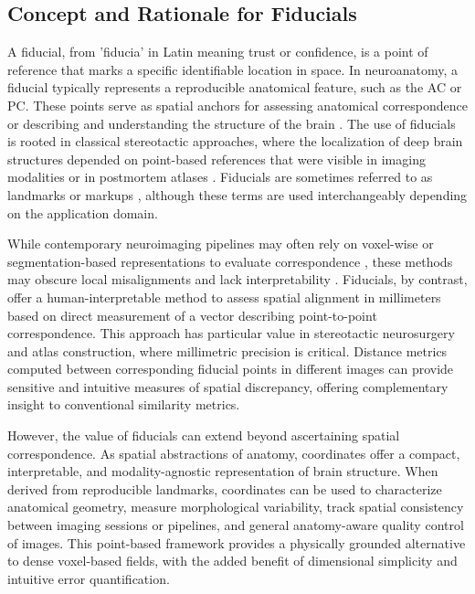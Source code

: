 \subsection{Concept and Rationale for Fiducials}
A fiducial, from 'fiducia' in Latin meaning trust or confidence, is a point of reference that marks a specific identifiable location in space. In neuroanatomy, a fiducial typically represents a reproducible anatomical feature, such as the AC or PC. These points serve as spatial anchors for assessing anatomical correspondence \cite{Schonecker2009-xj,Lau2019-eh} or describing and understanding the structure of the brain \cite{Abbass2022-lf}. The use of fiducials is rooted in classical stereotactic approaches, where the localization of deep brain structures depended on point-based references that were visible in imaging modalities or in postmortem atlases \cite{Schaltenbrand1977-ge, Talalrach1957-bs}. Fiducials are sometimes referred to as landmarks or markups \cite{Fedorov2012-rk}, although these terms are used interchangeably depending on the application domain. 

While contemporary neuroimaging pipelines may often rely on voxel-wise or segmentation-based representations to evaluate correspondence \cite{Chakravarty2008-mt,Hoffmann2024-yd}, these methods may obscure local misalignments \cite{Lau2019-eh} and lack interpretability \cite{Rohlfing2012-kt}. Fiducials, by contrast, offer a human-interpretable method to assess spatial alignment in millimeters based on direct measurement of a vector describing point-to-point correspondence. This approach has particular value in stereotactic neurosurgery and atlas construction, where millimetric precision is critical. Distance metrics computed between corresponding fiducial points in different images can provide sensitive and intuitive measures of spatial discrepancy, offering complementary insight to conventional similarity metrics.

However, the value of fiducials can extend beyond ascertaining spatial correspondence. As spatial abstractions of anatomy, coordinates offer a compact, interpretable, and modality-agnostic representation of brain structure. When derived from reproducible landmarks, coordinates can be used to characterize anatomical geometry, measure morphological variability, track spatial consistency between imaging sessions or pipelines, and general anatomy-aware quality control of images. This point-based framework provides a physically grounded alternative to dense voxel-based fields, with the added benefit of dimensional simplicity and intuitive error quantification.

